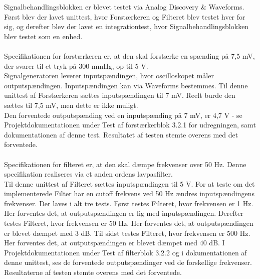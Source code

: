 Signalbehandlingsblokken er blevet testet via Analog Discovery \& Waveforms. Først blev der lavet unittest, hvor Forstærkeren og Filteret blev testet hver for sig, og derefter blev der lavet en integrationtest, hvor Signalbehandlingsblokken blev testet som en enhed. 
\\\\
Specifikationen for forstærkeren er, at den skal forstærke en spænding på 7,5 mV, der svarer til et tryk på 300 mmHg, op til 5 V. \\
Signalgeneratoren leverer inputspændingen, hvor oscilloskopet måler outputspændingen. Inputspændingen kan via Waveforms bestemmes. Til denne unittest af Forstærkeren sættes inputspændingen til 7 mV. Reelt burde den sættes til 7,5 mV, men dette er ikke muligt. \\
Den forventede outputspænding ved en inputspænding på 7 mV, er 4,7 V - se Projektdokumentationen under Test af forstærkerblok 3.2.1 for udregningen, samt dokumentationen af denne test.
Resultatet af testen stemte overens med det forventede. 
\\\\
Specifikationen for filteret er, at den skal dæmpe frekvenser over 50 Hz. Denne specifikation realiseres via et anden ordens lavpasfilter. \\
Til denne unittest af Filteret sættes inputspændingen til 5 V. For at teste om det implementerede Filter har en cutoff frekvens ved 50 Hz ændres inputspændingens frekvenser. Der laves i alt tre tests. Først testes Filteret, hvor frekvensen er 1 Hz. Her forventes det, at outputspændingen er lig med inputspændingen. Derefter testes Filteret, hvor frekvensen er 50 Hz. Her forventes det, at outputspændingen er blevet dæmpet med 3 dB. Til sidst testes Filteret, hvor frekvensen er 500 Hz. Her forventes det, at outputspændingen er blevet dæmpet med 40 dB. I Projektdokumentationen under Test af filterblok 3.2.2 og i dokumentationen af denne unittest, ses de forventede outputspændinger ved de forskellige frekvenser.
Resultaterne af testen stemte overens med det forventede.  


 

